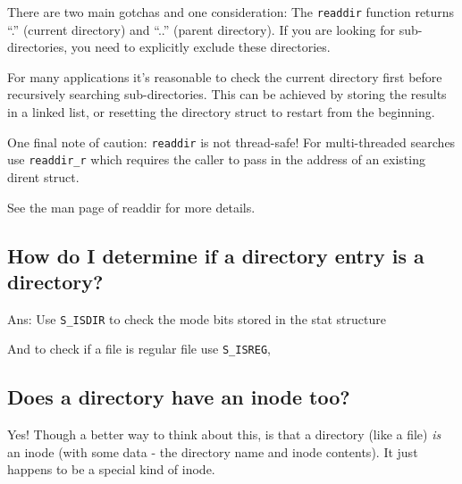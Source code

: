 There are two main gotchas and one consideration: The \texttt{readdir}
function returns ``.'' (current directory) and ``..'' (parent
directory). If you are looking for sub-directories, you need to
explicitly exclude these directories.

For many applications it's reasonable to check the current directory
first before recursively searching sub-directories. This can be achieved
by storing the results in a linked list, or resetting the directory
struct to restart from the beginning.

One final note of caution: \texttt{readdir} is not thread-safe! For
multi-threaded searches use \texttt{readdir\_r} which requires the
caller to pass in the address of an existing dirent struct.

See the man page of readdir for more details.

\subsection{How do I determine if a directory entry is a
directory?}\label{how-do-i-determine-if-a-directory-entry-is-a-directory}

Ans: Use \texttt{S\_ISDIR} to check the mode bits stored in the stat
structure

And to check if a file is regular file use \texttt{S\_ISREG},

\begin{Shaded}
\end{Shaded}

\subsection{Does a directory have an inode
too?}\label{does-a-directory-have-an-inode-too}

Yes! Though a better way to think about this, is that a directory (like
a file) \emph{is} an inode (with some data - the directory name and
inode contents). It just happens to be a special kind of inode.

